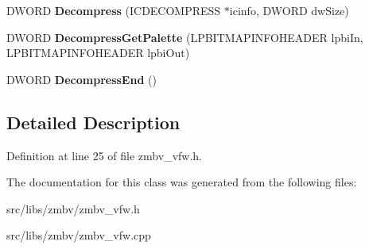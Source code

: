 \begin{DoxyCompactItemize}
\item 
\hypertarget{classCodecInst_a555ced98e7f54a97a7846a783290d616}{D\-W\-O\-R\-D {\bfseries Decompress} (I\-C\-D\-E\-C\-O\-M\-P\-R\-E\-S\-S $\ast$icinfo, D\-W\-O\-R\-D dw\-Size)}\label{classCodecInst_a555ced98e7f54a97a7846a783290d616}

\item 
\hypertarget{classCodecInst_a2bdb17bc81f463c1902302040d5cea26}{D\-W\-O\-R\-D {\bfseries Decompress\-Get\-Palette} (L\-P\-B\-I\-T\-M\-A\-P\-I\-N\-F\-O\-H\-E\-A\-D\-E\-R lpbi\-In, L\-P\-B\-I\-T\-M\-A\-P\-I\-N\-F\-O\-H\-E\-A\-D\-E\-R lpbi\-Out)}\label{classCodecInst_a2bdb17bc81f463c1902302040d5cea26}

\item 
\hypertarget{classCodecInst_aaecb22e388dcfed42417a43ba02f7c08}{D\-W\-O\-R\-D {\bfseries Decompress\-End} ()}\label{classCodecInst_aaecb22e388dcfed42417a43ba02f7c08}

\end{DoxyCompactItemize}


\subsection{Detailed Description}


Definition at line 25 of file zmbv\-\_\-vfw.\-h.



The documentation for this class was generated from the following files\-:\begin{DoxyCompactItemize}
\item 
src/libs/zmbv/zmbv\-\_\-vfw.\-h\item 
src/libs/zmbv/zmbv\-\_\-vfw.\-cpp\end{DoxyCompactItemize}
